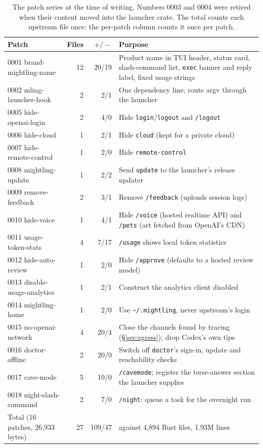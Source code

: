 \documentclass[11pt]{article}
\newcommand{\code}[1]{\texttt{#1}}
\begin{document}
\begin{table}[t]
\centering
\small
\begin{tabularx}{\linewidth}{@{}l r r X@{}}
\toprule
Patch & Files & $+/-$ & Purpose \\
\midrule
0001 brand-mightling-name & 12 & 20/19 & Product name in TUI header, status card, slash-command list, \code{exec} banner and reply label, fixed usage strings \\
0002 mling-launcher-hook & 2 & 2/1 & One dependency line; route argv through the launcher \\
0005 hide-openai-login & 2 & 4/0 & Hide \code{login}/\code{logout} and \code{/logout} \\
0006 hide-cloud & 1 & 2/1 & Hide \code{cloud} (kept for a private cloud) \\
0007 hide-remote-control & 1 & 2/0 & Hide \code{remote-control} \\
0008 mightling-update & 1 & 2/2 & Send \code{update} to the launcher's release updater \\
0009 remove-feedback & 2 & 3/1 & Remove \code{/feedback} (uploads session logs) \\
0010 hide-voice & 1 & 4/1 & Hide \code{/voice} (hosted realtime API) and \code{/pets} (art fetched from OpenAI's CDN) \\
0011 usage-token-stats & 4 & 7/17 & \code{/usage} shows local token statistics \\
0012 hide-auto-review & 1 & 2/0 & Hide \code{/approve} (defaults to a hosted review model) \\
0013 disable-usage-analytics & 1 & 2/1 & Construct the analytics client disabled \\
0014 mightling-home & 1 & 2/0 & Use \code{\textasciitilde/.mightling}, never upstream's login \\
0015 no-openai-network & 4 & 20/4 & Close the channels found by tracing (\S\ref{sec:egress}); drop Codex's own tips \\
0016 doctor-offline & 2 & 20/0 & Switch off \code{doctor}'s sign-in, update and reachability checks \\
0017 cave-mode & 5 & 10/0 & \code{/cavemode}; register the terse-answer section the launcher supplies \\
0018 night-slash-command & 2 & 7/0 & \code{/night}: queue a task for the overnight run \\
\midrule
Total (16 patches, 26{,}933 bytes) & 27 & 109/47 & against 4{,}894 Rust files, 1.93M lines \\
\bottomrule
\end{tabularx}
\caption{The patch series at the time of writing. Numbers 0003 and 0004 were retired when their
content moved into the launcher crate. The total counts each upstream file once; the per-patch
column counts it once per patch.}
\label{tab:patches}
\end{table}
\end{document}
